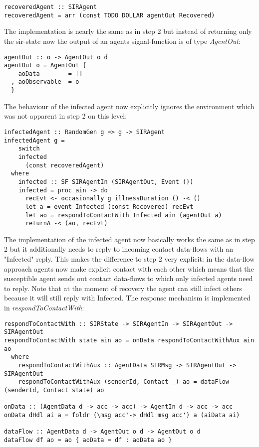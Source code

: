 \begin{verbatim}
recoveredAgent :: SIRAgent
recoveredAgent = arr (const TODO DOLLAR agentOut Recovered)
\end{verbatim}

The implementation is nearly the same as in step 2 but instead of returning only the sir-state now the output of an agents signal-function is of type \textit{AgentOut}:

\begin{verbatim}
agentOut :: o -> AgentOut o d
agentOut o = AgentOut {
    aoData        = []
  , aoObservable  = o
  }
\end{verbatim}

The behaviour of the infected agent now explicitly ignores the environment which was not apparent in step 2 on this level:

\begin{verbatim}
infectedAgent :: RandomGen g => g -> SIRAgent
infectedAgent g = 
    switch
    infected 
      (const recoveredAgent)
  where
    infected :: SF SIRAgentIn (SIRAgentOut, Event ())
    infected = proc ain -> do
      recEvt <- occasionally g illnessDuration () -< ()
      let a = event Infected (const Recovered) recEvt
      let ao = respondToContactWith Infected ain (agentOut a)
      returnA -< (ao, recEvt)
\end{verbatim}

The implementation of the infected agent now basically works the same as in step 2 but it additionally needs to reply to incoming contact data-flows with an "Infected" reply. This makes the difference to step 2 very explicit: in the data-flow approach agents now make explicit contact with each other which means that the susceptible agent sends out contact data-flows to which only infected agents need to reply.
Note that at the moment of recovery the agent can still infect others because it will still reply with Infected. The response mechanism is implemented in \textit{respondToContactWith}:

\begin{verbatim}
respondToContactWith :: SIRState -> SIRAgentIn -> SIRAgentOut -> SIRAgentOut
respondToContactWith state ain ao = onData respondToContactWithAux ain ao
  where
    respondToContactWithAux :: AgentData SIRMsg -> SIRAgentOut -> SIRAgentOut
    respondToContactWithAux (senderId, Contact _) ao = dataFlow (senderId, Contact state) ao
    
onData :: (AgentData d -> acc -> acc) -> AgentIn d -> acc -> acc
onData dHdl ai a = foldr (\msg acc'-> dHdl msg acc') a (aiData ai)

dataFlow :: AgentData d -> AgentOut o d -> AgentOut o d
dataFlow df ao = ao { aoData = df : aoData ao }
\end{verbatim}

